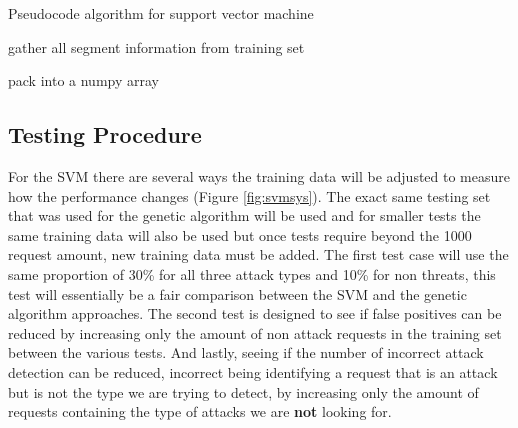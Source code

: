 \begin{algorithm}[H]
	\caption{Pseudocode algorithm for support vector machine}
	\label{alg:svm}
	
	gather all segment information from training set\;
	
	pack into a numpy array\;
	
\end{algorithm}

\subsection{Testing Procedure}

For the SVM there are several ways the training data will be adjusted to measure how the performance changes (Figure \ref{fig:svmsys}).  The exact same testing set that was used for the genetic algorithm will be used and for smaller tests the same training data will also be used but once tests require beyond the 1000 request amount, new training data must be added.  The first test case will use the same proportion of 30\% for all three attack types and 10\% for non threats, this test will essentially be a fair comparison between the SVM and the genetic algorithm approaches.  The second test is designed to see if false positives can be reduced by increasing only the amount of non attack requests in the training set between the various tests.  And lastly, seeing if the number of incorrect attack detection can be reduced, incorrect being identifying a request that is an attack but is not the type we are trying to detect, by increasing only the amount of requests containing the type of attacks we are \textbf{not} looking for.

